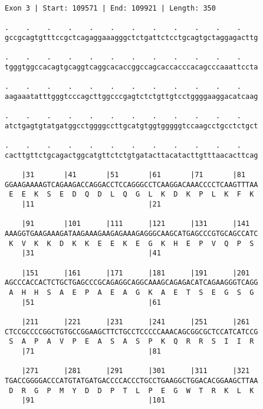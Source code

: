 \documentclass{article}
\begin{document}
\newpage
\begin{Verbatim}[fontfamily=courier]
Exon 3 | Start: 109571 | End: 109921 | Length: 350

.    .    .    .    .    .    .    .    .    .    .    .    
gccgcagtgtttccgctcagaggaaagggctctgattctcctgcagtgctaggagacttg

.    .    .    .    .    .    .    .    .    .    .    .    
tgggtggccacagtgcaggtcaggcacaccggccagcaccacccacagcccaaattccta

.    .    .    .    .    .    .    .    .    .    .    .    
aagaaatatttgggtcccagcttggcccgagtctctgttgtcctggggaaggacatcaag

.    .    .    .    .    .    .    .    .    .    .    .    
atctgagtgtatgatggcctggggccttgcatgtggtgggggtccaagcctgcctctgct

.    .    .    .    .    .    .    .    .    .    .    .    
cacttgttctgcagactggcatgttctctgtgatacttacatacttgtttaacacttcag

    |31       |41       |51       |61       |71       |81   
GGAAGAAAAGTCAGAAGACCAGGACCTCCAGGGCCTCAAGGACAAACCCCTCAAGTTTAA
 E  E  K  S  E  D  Q  D  L  Q  G  L  K  D  K  P  L  K  F  K 
    |11                           |21                       

    |91       |101      |111      |121      |131      |141  
AAAGGTGAAGAAAGATAAGAAAGAAGAGAAAGAGGGCAAGCATGAGCCCGTGCAGCCATC
 K  V  K  K  D  K  K  E  E  K  E  G  K  H  E  P  V  Q  P  S 
    |31                           |41                       

    |151      |161      |171      |181      |191      |201  
AGCCCACCACTCTGCTGAGCCCGCAGAGGCAGGCAAAGCAGAGACATCAGAAGGGTCAGG
 A  H  H  S  A  E  P  A  E  A  G  K  A  E  T  S  E  G  S  G 
    |51                           |61                       

    |211      |221      |231      |241      |251      |261  
CTCCGCCCCGGCTGTGCCGGAAGCTTCTGCCTCCCCCAAACAGCGGCGCTCCATCATCCG
 S  A  P  A  V  P  E  A  S  A  S  P  K  Q  R  R  S  I  I  R 
    |71                           |81                       

    |271      |281      |291      |301      |311      |321  
TGACCGGGGACCCATGTATGATGACCCCACCCTGCCTGAAGGCTGGACACGGAAGCTTAA
 D  R  G  P  M  Y  D  D  P  T  L  P  E  G  W  T  R  K  L  K 
    |91                           |101                      

\end{Verbatim}
\newpage
\end{document}
